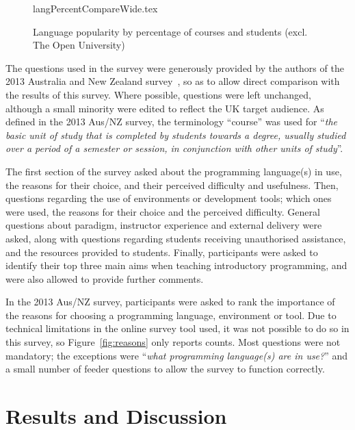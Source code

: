 \documentclass[english,submission]{programming}
\begin{document}
\begin{figure}
\begin{center}
{langPercentCompareWide.tex}
\end{center}
\caption{Language popularity by percentage of courses and students
  (excl. The Open University)\label{fig:lang}}
\end{figure}

The questions used in the survey were generously provided by the
authors of the 2013 Australia and New Zealand
survey~\cite{mason+cooper:2014}, so as to allow direct comparison with
the results of this survey. Where possible, questions were left
unchanged, although a small minority were edited to reflect the UK
target audience. As defined in the 2013 Aus/NZ survey, the terminology
``course'' was used for ``{\emph{the basic unit of study that is
completed by students towards a degree, usually studied over a period
of a semester or session, in conjunction with other units of
study}}''.

The first section of the survey asked about the programming
language(s) in use, the reasons for their choice, and their perceived
difficulty and usefulness. Then, questions regarding the use of
environments or development tools; which ones were used, the reasons
for their choice and the perceived difficulty. General questions about
paradigm, instructor experience and external delivery were asked,
along with questions regarding students receiving unauthorised
assistance, and the resources provided to students. Finally,
participants were asked to identify their top three main aims when
teaching introductory programming, and were also allowed to provide
further comments.

In the 2013 Aus/NZ survey, participants were asked to rank
the importance of the reasons for choosing a programming language,
environment or tool. Due to technical limitations in the online survey
tool used, it was not possible to do so in this survey, so
Figure~\ref{fig:reasons} only reports counts. Most questions were not
mandatory; the exceptions were ``{\emph{what programming language(s)
are in use?}}'' and a small number of feeder questions to allow the
survey to function correctly.


\section{Results and Discussion}\label{results}
\end{document}
